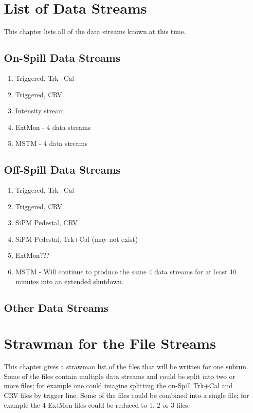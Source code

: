\chapter{List of Data Streams}
\label{ch:data_streams}

This chapter lists all of the data streams known at this time.

\section{On-Spill Data Streams}
\label{sec:on_spill_data_streams}

\begin{enumerate}
\item Triggered, Trk+Cal
\item Triggered, CRV
\item Intensity stream
\item ExtMon - 4 data streams
\item MSTM - 4 data streams
\end{enumerate}

\section{Off-Spill Data Streams}
\label{sec:off_spill_data_streams}

\begin{enumerate}
\item Triggered, Trk+Cal
\item Triggered, CRV
\item SiPM Pedestal, CRV
  \item SiPM Pedestal, Trk+Cal (may not exist)
\item ExtMon???
\item MSTM - Will continue to produce the same 4 data streams for at least 10 minutes into an extended shutdown.
\end{enumerate}

\section{Other Data Streams}
\label{sec:Other_data_streams}

\chapter{Strawman for the File Streams}
\label{ch:file_streams}

This chapter gives a strawman list of the files that will be written for one subrun.
Some of the files contain multiple data streams and could be split into two or more files;
for example one could imagine splitting the on-Spill Trk+Cal and CRV files by trigger line.
Some of the files could be combined into a single file; for example the 4 ExtMon files could
be reduced to 1, 2 or 3 files.

